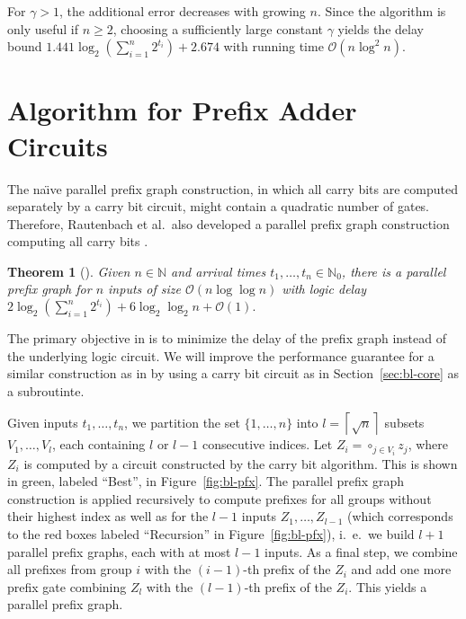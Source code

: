 \documentclass[11pt,final,microtype]{scrartcl}
\theoremstyle{plain}
\newtheorem{theorem}{Theorem}[section]
\theoremstyle{definition}
\theoremstyle{remark}
\newcommand{\ceil}[1]{\left\lceil #1 \right\rceil}
\newcommand{\ld}{\log_{2}}
\begin{document}
For $\gamma > 1$, the additional error decreases with growing $n$. Since the algorithm
is only useful if $n \geq 2$, choosing a sufficiently large constant
$\gamma$ yields the delay bound $1.441 \ld \left(\sum_{i=1}^n
  2^{t_i}\right) + 2.674$ with running time $\mathcal{O}(n \log^2
n)$. 

\section{Algorithm for Prefix Adder Circuits}\label{sec:bl-adder}
The na\"{\i}ve parallel prefix graph construction, in which all carry
bits are computed separately by a carry bit circuit, might contain a quadratic
number of gates. Therefore, Rautenbach et al.\  also developed a parallel prefix graph construction
computing all carry bits \cite{bonn2}.

\begin{theorem}[{\cite{bonn2}}] \label{thm:bl-ppfx} Given $n \in
  \mathbb{N}$ and arrival times $t_1, \dots, t_n \in \mathbb{N}_0$, there is a
  parallel prefix graph for $n$ inputs of size $\mathcal{O}(n \log
  \log n)$ with logic delay $2\log_2\left(\sum_{i=1}^n 2^{t_i}\right) + 6 \ld \ld n + \mathcal{O}(1).$
\end{theorem}

The primary objective in \cite{bonn2} is to minimize the delay of the
prefix graph instead of the underlying logic circuit.  We will improve
the performance guarantee for a similar construction as in
\cite{bonn2} by using a carry bit circuit as in
Section~\ref{sec:bl-core} as a subroutinte.

Given inputs $t_1, \dots, t_n$, we partition the set $\{1, \dots, n\}$
into $l = \ceil{\sqrt{n}}$ subsets $V_1, \dots, V_l$, each containing
$l$ or $l-1$ consecutive indices. Let $Z_i = \circ_{j \in V_i} z_j$,
where $Z_i$ is computed by a circuit constructed by the carry bit
algorithm. This is shown in green, labeled ``Best'', in
Figure~\ref{fig:bl-pfx}. The parallel prefix graph construction is
applied recursively to compute prefixes for all groups without their
highest index as well as for the $l-1$ inputs $Z_1, \dots, Z_{l-1}$
(which corresponds to the red boxes labeled ``Recursion'' in
Figure~\ref{fig:bl-pfx}), i.\ e.\ we build $l+1$ parallel prefix
graphs, each with at most $l-1$ inputs. As a final step, we combine
all prefixes from group $i$ with the $(i-1)$-th prefix of the $Z_i$
and add one more prefix gate combining $Z_l$ with the $(l-1)$-th
prefix of the $Z_i$. This yields a parallel prefix graph.
\end{document}

